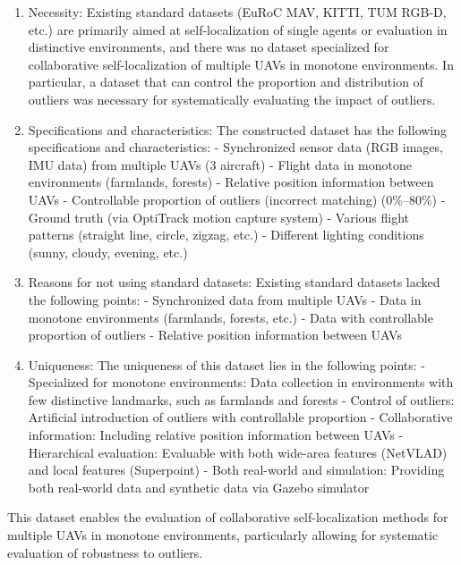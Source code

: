 \documentclass[a4paper,fleqn,10pt,twocolumn]{SICE_ISCS}
\begin{document}
\begin{enumerate}
\item Necessity:
   Existing standard datasets (EuRoC MAV, KITTI, TUM RGB-D, etc.) are primarily aimed at self-localization of single agents or evaluation in distinctive environments, and there was no dataset specialized for collaborative self-localization of multiple UAVs in monotone environments. In particular, a dataset that can control the proportion and distribution of outliers was necessary for systematically evaluating the impact of outliers.

\item Specifications and characteristics:
   The constructed dataset has the following specifications and characteristics:
   - Synchronized sensor data (RGB images, IMU data) from multiple UAVs (3 aircraft)
   - Flight data in monotone environments (farmlands, forests)
   - Relative position information between UAVs
   - Controllable proportion of outliers (incorrect matching) (0\%–80\%)
   - Ground truth (via OptiTrack motion capture system)
   - Various flight patterns (straight line, circle, zigzag, etc.)
   - Different lighting conditions (sunny, cloudy, evening, etc.)

\item Reasons for not using standard datasets:
   Existing standard datasets lacked the following points:
   - Synchronized data from multiple UAVs
   - Data in monotone environments (farmlands, forests, etc.)
   - Data with controllable proportion of outliers
   - Relative position information between UAVs

\item Uniqueness:
   The uniqueness of this dataset lies in the following points:
   - Specialized for monotone environments: Data collection in environments with few distinctive landmarks, such as farmlands and forests
   - Control of outliers: Artificial introduction of outliers with controllable proportion
   - Collaborative information: Including relative position information between UAVs
   - Hierarchical evaluation: Evaluable with both wide-area features (NetVLAD) and local features (Superpoint)
   - Both real-world and simulation: Providing both real-world data and synthetic data via Gazebo simulator
\end{enumerate}

This dataset enables the evaluation of collaborative self-localization methods for multiple UAVs in monotone environments, particularly allowing for systematic evaluation of robustness to outliers.
\end{document}
